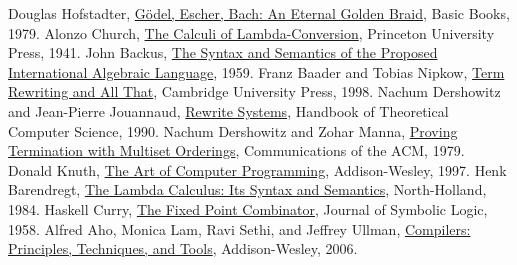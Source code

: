 \documentclass{article}
\theoremstyle{plain}
\theoremstyle{definition}
\theoremstyle{remark}
\begin{document}
\begin{thebibliography}{99}
 Douglas Hofstadter, \href{https://en.wikipedia.org/wiki/G%C3%B6del,_Escher,_Bach}{Gödel, Escher, Bach: An Eternal Golden Braid}, Basic Books, 1979.
 Alonzo Church, \href{https://en.wikipedia.org/wiki/Lambda_calculus}{The Calculi of Lambda-Conversion}, Princeton University Press, 1941.
 John Backus, \href{https://en.wikipedia.org/wiki/Backus%E2%80%93Naur_form}{The Syntax and Semantics of the Proposed International Algebraic Language}, 1959.
 Franz Baader and Tobias Nipkow, \href{https://en.wikipedia.org/wiki/Abstract_rewriting_system}{Term Rewriting and All That}, Cambridge University Press, 1998.
 Nachum Dershowitz and Jean-Pierre Jouannaud, \href{https://en.wikipedia.org/wiki/Term_rewriting}{Rewrite Systems}, Handbook of Theoretical Computer Science, 1990.
 Nachum Dershowitz and Zohar Manna, \href{https://en.wikipedia.org/wiki/Termination_analysis}{Proving Termination with Multiset Orderings}, Communications of the ACM, 1979.
 Donald Knuth, \href{https://en.wikipedia.org/wiki/Euclidean_algorithm}{The Art of Computer Programming}, Addison-Wesley, 1997.
 Henk Barendregt, \href{https://en.wikipedia.org/wiki/Lambda_calculus}{The Lambda Calculus: Its Syntax and Semantics}, North-Holland, 1984.
 Haskell Curry, \href{https://en.wikipedia.org/wiki/Fixed-point_combinator}{The Fixed Point Combinator}, Journal of Symbolic Logic, 1958.
 Alfred Aho, Monica Lam, Ravi Sethi, and Jeffrey Ullman, \href{https://en.wikipedia.org/wiki/Compiler}{Compilers: Principles, Techniques, and Tools}, Addison-Wesley, 2006.
\end{thebibliography}
\end{document}
